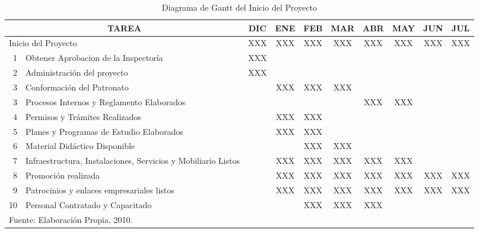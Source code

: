 \begin{table}
    \centering
    \caption{Diagrama de Gantt del Inicio del Proyecto}
    \label{tbl:Proy:Gantt}
    \footnotesize
    \begin{tabular}{r|p{6cm}|c|c|c|c|c|c|c|c}
        \multicolumn{2}{c|}{TAREA}                                         & DIC & ENE & FEB & MAR & ABR & MAY & JUN & JUL \\
        \hline
        \hline
        \multicolumn{2}{l|}{Inicio del Proyecto}                           & XXX & XXX & XXX & XXX & XXX & XXX & XXX & XXX \\
        \hline
        1  & Obtener Aprobacion de la Inspectoría                          & XXX &     &     &     &     &     &     &     \\
        2  & Administración del proyecto                                   & XXX &     &     &     &     &     &     &     \\
        3  & Conformación del Patronato                                    &     & XXX & XXX & XXX &     &     &     &     \\
        3  & Procesos Internos y Reglamento Elaborados                     &     &     &     &     & XXX & XXX &     &     \\
        4  & Permisos y Trámites Realizados                                &     & XXX & XXX &     &     &     &     &     \\
        5  & Planes y Programas de Estudio Elaborados                      &     & XXX & XXX &     &     &     &     &     \\
        6  & Material Didáctico Disponible                                 &     &     & XXX & XXX &     &     &     &     \\
        7  & Infraestructura, Instalaciones, Servicios y Mobiliario Listos &     & XXX & XXX & XXX & XXX & XXX &     &     \\
        8  & Promoción realizada                                           &     & XXX & XXX & XXX & XXX & XXX & XXX & XXX \\
        9  & Patrocinios y enlaces empresariales listos                    &     & XXX & XXX & XXX & XXX & XXX & XXX & XXX \\
        10 & Personal Contratado y Capacitado                              &     &     & XXX & XXX & XXX &     &     &     \\
        \hline
        \multicolumn{10}{l}{\footnotesize Fuente: Elaboración Propia, 2010.}
    \end{tabular}
\end{table}

